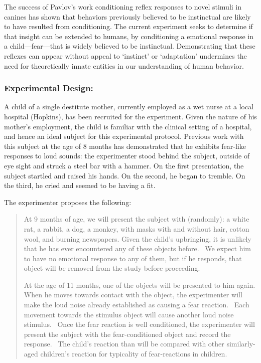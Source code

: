 \begin{refsection}
The success of Pavlov's work conditioning reflex responses to novel stimuli in canines has shown that behaviors previously believed to be instinctual are likely to have resulted from conditioning. The current experiment seeks to determine if that insight can be extended to humans, by conditioning a emotional response in a child—fear—that is widely believed to be instinctual. Demonstrating that these reflexes can appear without appeal to `instinct' or `adaptation' undermines the need for theoretically innate entities in our understanding of human behavior.

\subsubsection{Experimental Design:}
\label{experimentaldesign:}

A child of a single destitute mother, currently employed as a wet nurse at a local hospital (Hopkins), has been recruited for the experiment. Given the nature of his mother's employment, the child is familiar with the clinical setting of a hospital, and hence an ideal subject for this experimental protocol. Previous work with this subject at the age of 8 months has demonstrated that he exhibits fear-like responses to loud sounds: the experimenter stood behind the subject, outside of eye sight and struck a steel bar with a hammer. On the first presentation, the subject startled and raised his hands. On the second, he began to tremble. On the third, he cried and seemed to be having a fit.

The experimenter proposes the following:

\begin{quote}

At 9 months of age, we will present the subject with (randomly): a white rat, a rabbit, a dog, a monkey, with masks with and without hair, cotton wool, and burning newspapers. Given the child's upbringing, it is unlikely that he has ever encountered any of these objects before.  We expect him to have no emotional response to any of them, but if he responds, that object will be removed from the study before proceeding.

At the age of 11 months, one of the objects will be presented to him again. When he moves towards contact with the object, the experimenter will make the loud noise already established as causing a fear reaction.  Each movement towards the stimulus object will cause another loud noise stimulus.  Once the fear reaction is well conditioned, the experimenter will present the subject with the fear-conditioned object and record the response.  The child's reaction than will be compared with other similarly-aged children's reaction for typicality of fear-reactions in children.


\end{quote}
\end{refsection}
